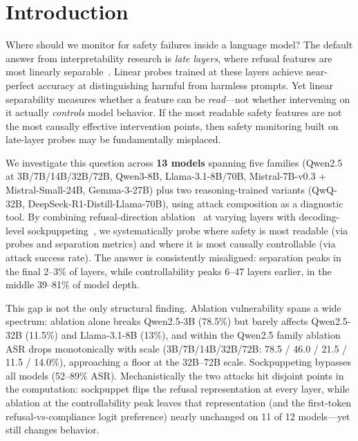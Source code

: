 \documentclass{article}
\begin{document}
\section{Introduction}

Where should we monitor for safety failures inside a language model? The default answer from interpretability research is \textit{late layers}, where refusal features are most linearly separable~\citep{arditi2024refusal}. Linear probes trained at these layers achieve near-perfect accuracy at distinguishing harmful from harmless prompts. Yet linear separability measures whether a feature can be \textit{read}---not whether intervening on it actually \textit{controls} model behavior. If the most readable safety features are not the most causally effective intervention points, then safety monitoring built on late-layer probes may be fundamentally misplaced.

We investigate this question across \textbf{13 models} spanning five families (Qwen2.5 at 3B/7B/14B/32B/72B, Qwen3-8B, Llama-3.1-8B/70B, Mistral-7B-v0.3 + Mistral-Small-24B, Gemma-3-27B) plus two reasoning-trained variants (QwQ-32B, DeepSeek-R1-Distill-Llama-70B), using attack composition as a diagnostic tool. By combining refusal-direction ablation~\citep{arditi2024refusal} at varying layers with decoding-level sockpuppeting~\citep{dotsinski2026sockpuppetting}, we systematically probe where safety is most readable (via probes and separation metrics) and where it is most causally controllable (via attack success rate). The answer is consistently misaligned: separation peaks in the final 2--3\% of layers, while controllability peaks 6--47 layers earlier, in the middle 39--81\% of model depth.

This gap is not the only structural finding. Ablation vulnerability spans a wide spectrum: ablation alone breaks Qwen2.5-3B (78.5\%) but barely affects Qwen2.5-32B (11.5\%) and Llama-3.1-8B (13\%), and within the Qwen2.5 family ablation ASR drops monotonically with scale (3B/7B/14B/32B/72B: 78.5 / 46.0 / 21.5 / 11.5 / 14.0\%), approaching a floor at the 32B--72B scale. Sockpuppeting bypasses all models (52--89\% ASR). Mechanistically the two attacks hit disjoint points in the computation: sockpuppet flips the refusal representation at every layer, while ablation at the controllability peak leaves that representation (and the first-token refusal-vs-compliance logit preference) nearly unchanged on 11 of 12 models---yet still changes behavior.
\end{document}
